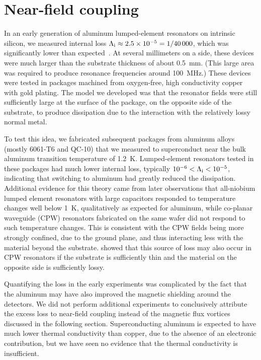 

\section{Near-field coupling}
\label{sec:loss.near-field}


In an early generation of aluminum lumped-element resonators on intrinsic silicon, we measured internal loss $\Lambda_{\mathrm{i}} \approx \num{2.5e-5} = 1 / \num{40000}$, which was significantly lower than expected~\autocite{McCarrick2014RSI}.
At several millimeters on a side, these devices were much larger than the substrate thickness of about \SI{0.5}{mm}.
(This large area was required to produce resonance frequencies around \SI{100}{MHz}.)
These devices were tested in packages machined from oxygen-free, high conductivity copper with gold plating.
The model we developed was that the resonator fields were still sufficiently large at the surface of the package, on the opposite side of the substrate, to produce dissipation due to the interaction with the relatively lossy normal metal.

To test this idea, we fabricated subsequent packages from aluminum alloys (mostly 6061-T6 and QC-10) that we measured to superconduct near the bulk aluminum transition temperature of \SI{1.2}{K}.
Lumped-element resonators tested in these packages had much lower internal loss, typically
$\num{e-6} < \Lambda_{\mathrm{i}} < \num{e-5}$, indicating that switching to aluminum had greatly reduced the dissipation.
Additional evidence for this theory came from later observations that all-niobium lumped element resonators with large capacitors responded to temperature changes well below \SI{1}{K}, qualitatively as expected for aluminum, while co-planar waveguide (CPW) resonators fabricated on the same wafer did not respond to such temperature changes.
This is consistent with the CPW fields being more strongly confined, due to the ground plane, and thus interacting less with the material beyond the substrate. 
\textcite{Goetz2016JAP} showed that this source of loss may also occur in CPW resonators if the substrate is sufficiently thin and the material on the opposite side is sufficiently lossy.

Quantifying the loss in the early experiments was complicated by the fact that the aluminum may have also improved the magnetic shielding around the detectors.
We did not perform additional experiments to conclusively attribute the excess loss to near-field coupling instead of the magnetic flux vortices discussed in the following section.
Superconducting aluminum is expected to have much lower thermal conductivity than copper, due to the absence of an electronic contribution, but we have seen no evidence that the thermal conductivity is insufficient.


